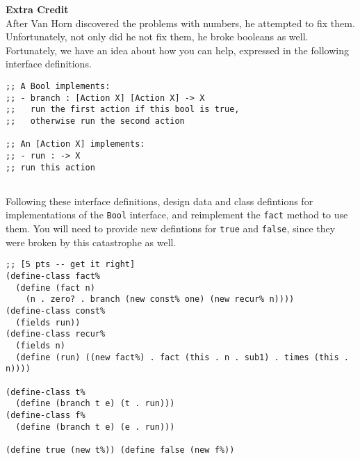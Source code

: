 \documentclass[12pt]{article}                   %
\def\pts#1{\marginpar{\footnotesize \raggedright  \fbox{#1 {\sc Points}}}}
\newenvironment{solution}{}{}
\begin{document}
\begin{problem}\pts{5}

\textbf{Extra Credit}
\\
\noindent
After Van Horn discovered the problems with numbers, he attempted to
fix them.  Unfortunately, not only did he not fix them, he broke
booleans as well.  Fortunately, we have an idea about how you can
help, expressed in the following interface definitions.  

\begin{verbatim}
;; A Bool implements:
;; - branch : [Action X] [Action X] -> X
;;   run the first action if this bool is true, 
;;   otherwise run the second action

;; An [Action X] implements:
;; - run : -> X
;; run this action


\end{verbatim}

Following these interface definitions, design data and class
defintions for implementations of the \verb|Bool| interface, and
reimplement the \verb|fact| method to use them.
You will need to provide new defintions for \verb|true| and
\verb|false|, since they were broken by this catastrophe as well.

\ifrubric\else
{}
\fi


\begin{solution}
\begin{verbatim}
;; [5 pts -- get it right]
(define-class fact%
  (define (fact n)
    (n . zero? . branch (new const% one) (new recur% n))))
(define-class const%
  (fields run))
(define-class recur%
  (fields n)
  (define (run) ((new fact%) . fact (this . n . sub1) . times (this . n))))

(define-class t%
  (define (branch t e) (t . run)))
(define-class f%
  (define (branch t e) (e . run)))

(define true (new t%)) (define false (new f%))
\end{verbatim}
\end{solution}
\end{problem}
\end{document}
